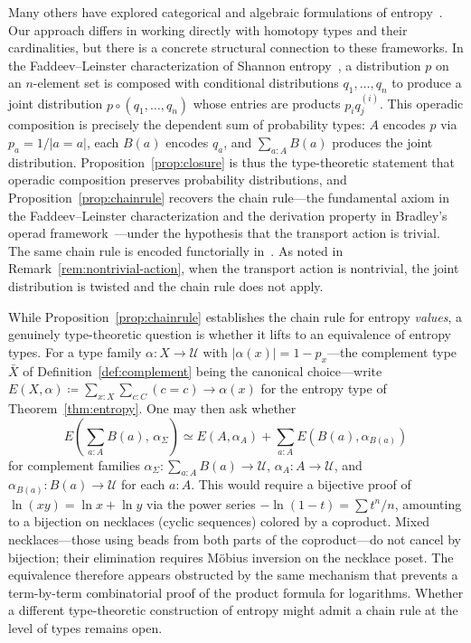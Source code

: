 \documentclass[12pt]{amsart}
\newcommand{\U}{\mathcal{U}}
\theoremstyle{plain}
\theoremstyle{definition}
\theoremstyle{remark}
\begin{document}
Many others have explored categorical and algebraic formulations of entropy~\cite{baez2011characterization,leinster2021entropy,bradley2021entropy,spivak2021dirichlet,spivak2022polynomial,leinster2019short,gagne2018categorical,parzygnat2020functorial,parzygnat2021towards}. Our approach differs in working directly with homotopy types and their cardinalities, but there is a concrete structural connection to these frameworks. In the Faddeev--Leinster characterization of Shannon entropy~\cite{leinster2021entropy}, a distribution $p$ on an $n$-element set is composed with conditional distributions $q_1,\ldots,q_n$ to produce a joint distribution $p\circ(q_1,\ldots,q_n)$ whose entries are products $p_iq_j^{(i)}$. This operadic composition is precisely the dependent sum of probability types: $A$ encodes $p$ via $p_a=1/|a=a|$, each $B(a)$ encodes $q_a$, and $\sum_{a:A}B(a)$ produces the joint distribution. Proposition~\ref{prop:closure} is thus the type-theoretic statement that operadic composition preserves probability distributions, and Proposition~\ref{prop:chainrule} recovers the chain rule---the fundamental axiom in the Faddeev--Leinster characterization and the derivation property in Bradley's operad framework~\cite{bradley2021entropy}---under the hypothesis that the transport action is trivial. The same chain rule is encoded functorially in~\cite{baez2011characterization}. As noted in Remark~\ref{rem:nontrivial-action}, when the transport action is nontrivial, the joint distribution is twisted and the chain rule does not apply.

While Proposition~\ref{prop:chainrule} establishes the chain rule for entropy \emph{values}, a genuinely type-theoretic question is whether it lifts to an equivalence of entropy types. For a type family $\alpha:X\to\U$ with $|\alpha(x)|=1-p_x$---the complement type $\bar{X}$ of Definition~\ref{def:complement} being the canonical choice---write $E(X,\alpha)\coloneqq\sum_{x:X}\sum_{c:C}(c=c)\to\alpha(x)$ for the entropy type of Theorem~\ref{thm:entropy}. One may then ask whether
\[
E\!\left(\sum_{a:A}B(a),\,\alpha_\Sigma\right) \simeq E(A,\alpha_A)+\sum_{a:A}E(B(a),\alpha_{B(a)})
\]
for complement families $\alpha_\Sigma:\sum_{a:A}B(a)\to\U$, $\alpha_A:A\to\U$, and $\alpha_{B(a)}:B(a)\to\U$ for each $a:A$. This would require a bijective proof of $\ln(xy)=\ln x+\ln y$ via the power series $-\ln(1-t)=\sum t^n/n$, amounting to a bijection on necklaces (cyclic sequences) colored by a coproduct. Mixed necklaces---those using beads from both parts of the coproduct---do not cancel by bijection; their elimination requires M\"obius inversion on the necklace poset. The equivalence therefore appears obstructed by the same mechanism that prevents a term-by-term combinatorial proof of the product formula for logarithms. Whether a different type-theoretic construction of entropy might admit a chain rule at the level of types remains open.
\end{document}
